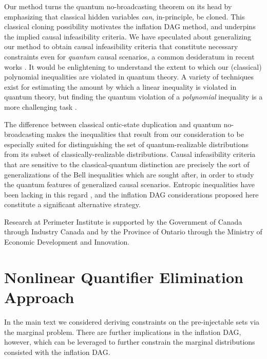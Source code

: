 {Our method turns the quantum no-broadcasting theorem \cite{NoCloningQuantum1996,NoCloningGeneral2006} on its head by emphasizing that classical hidden variables \emph{can}, in-principle, be cloned. This classical cloning possibility motivates the inflation DAG method, and underpins the implied causal infeasibility criteria. We have speculated about generalizing our method to obtain causal infeasibility criteria that constitute necessary constraints even for \emph{quantum} causal scenarios, a common desideratum in recent works \cite{fritz2012bell,pusey2014gdag,Chaves2015infoquantum,ChavesNoSignalling,BeyondBellII}. It would be enlightening to understand the extent to which our (classical) polynomial inequalities are violated in quantum theory. A variety of techniques exist for estimating the amount by which a linear inequality \cite{NPA2008Long,I3322NPA1} is violated in quantum theory, but finding the quantum violation of a \emph{polynomial} inequality is a more challenging task \cite{NPAReview}.

The difference between classical ontic-state duplication and quantum no-broadcasting makes the inequalities that result from our consideration to be especially suited for distinguishing the set of quantum-realizable distributions from its subset of classically-realizable distributions. Causal infeasibility criteria that are sensitive to the classical-quantum distinction are precisely the sort of generalizations of the Bell inequalities which are sought after, in order to study the quantum features of generalized causal scenarios. Entropic inequalities have been lacking in this regard \cite{fritz2012bell,pusey2014gdag,Chaves2015infoquantum}, and the inflation DAG considerations proposed here constitute a significant alternative strategy.





\begin{acknowledgments}
Research at Perimeter Institute is supported by the Government of Canada through Industry Canada and by the Province of Ontario through the Ministry of Economic Development and Innovation.
\end{acknowledgments}


\onecolumngrid
\appendix
\renewcommand{\theequation}{A-\arabic{equation}}
\setcounter{equation}{0}

\section{Nonlinear Quantifier Elimination Approach}\label{sec:nonlinearelimination}
In the main text we considered deriving constraints on the pre-injectable sets via the marginal problem. There are further implications in the inflation DAG, however, which can be leveraged to further constrain the marginal distributions consisted with the inflation DAG.

}
